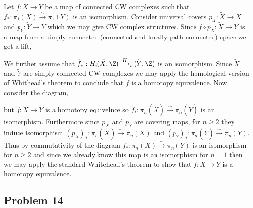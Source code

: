 \documentclass[12pt]{extarticle}
\begin{document}
Let $f : X \to Y$ be a map of connected CW complexes such that $f_* : \pi_1(X) \xrightarrow{\sim} \pi_1(Y)$ is an isomorphism. Consider universal covers $p_X : \tilde{X} \to X$ and $p_Y : \tilde{Y} \to Y$  which we may give CW complex structures. Since $f \circ p_X : \tilde{X} \to Y$ is a map from a simply-connected (connected and locally-path-connected) space we get a lift,
\begin{center}
\end{center}
We further assume that $\tilde{f}_* : H_i(\tilde{X}, \Z) \xrightarrow H_i(\tilde{Y}, \Z)$ is an isomorphism. Since $\tilde{X}$ and $\tilde{Y}$ are simply-connected CW complexes we may apply the homological version of Whithead's theorem to conclude that $\tilde{f}$ is a homotopy equivalence. Now consider the diagram,
\begin{center}
\end{center}
but $\tilde{f} : \tilde{X} \to \tilde{Y}$ is a homotopy equivelnce so $\tilde{f}_* : \pi_n(\tilde{X}) \xrightarrow{\sim} \pi_n(\tilde{Y})$ is an isomorphism. Furthermore since $p_X$ and $p_Y$ are covering maps, for $n \ge 2$ they induce isomorphism $(p_X)_* : \pi_n(\tilde{X}) \xrightarrow{\sim} \pi_n(X)$ and $(p_Y)_* : \pi_n(\tilde{Y}) \xrightarrow{\sim} \pi_n(Y)$. Thus by commutativity of the diagram $f_* : \pi_n(X) \xrightarrow{\sim} \pi_n(Y)$ is an isomorphism for $n \ge 2$ and since we already know this map is an isomorphism for $n = 1$ then we may apply the standard Whitehead's theorem to show that $f : X \to Y$ is a homotopy equivalence. 
 
\subsection{Problem 14}
\end{document}
